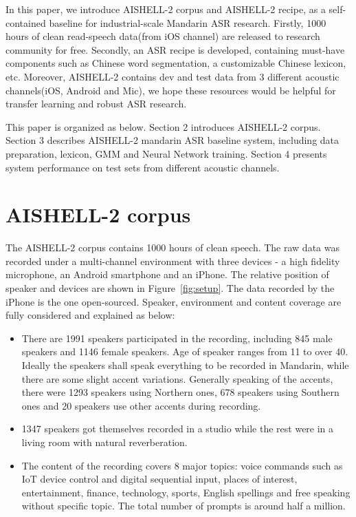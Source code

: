 \documentclass[a4paper]{article}
\begin{document}
In this paper, we introduce AISHELL-2 corpus and AISHELL-2 recipe, as a 
self-contained baseline for industrial-scale Mandarin ASR research. 
Firstly, 1000 hours of clean read-speech data(from iOS channel) are released to research community for free.
Secondly, an ASR recipe is developed, containing must-have components 
such as Chinese word segmentation, a customizable Chinese lexicon, etc. 
Moreover, AISHELL-2 contains dev and test data from 3 different acoustic channels(iOS, Android and Mic),
we hope these resources would be helpful for transfer learning and robust ASR research.

This paper is organized as below. Section 2 introduces AISHELL-2 corpus. 
Section 3 describes AISHELL-2 mandarin ASR baseline system, including data preparation, lexicon, GMM and Neural Network training.
Section 4 presents system performance on test sets from different acoustic channels.

\section{AISHELL-2 corpus}

The AISHELL-2 corpus contains 1000 hours of clean speech. The raw data was recorded under a multi-channel environment with three devices - a high fidelity microphone, an Android smartphone and an iPhone. The relative position of speaker and devices are shown in Figure~\ref{fig:setup}. The data recorded by the iPhone is the one open-sourced. Speaker, environment and content coverage are fully considered and explained as below:
\begin{itemize}
\item There are 1991 speakers participated in the recording, including 845 male speakers and 1146 female speakers. Age of speaker ranges from 11 to over 40. Ideally the speakers shall speak everything to be recorded in Mandarin, while there are some slight accent variations. Generally speaking of the accents, there were 1293 speakers using Northern ones, 678 speakers using Southern ones and 20 speakers use other accents during recording. 
\item 1347 speakers got themselves recorded in a studio while the rest were in a living room with natural reverberation.
\item The content of the recording covers 8 major topics: voice commands such as IoT device control and digital sequential input, places of interest, entertainment, finance, technology, sports, English spellings and free speaking without specific topic. The total number of prompts is around half a million.
\end{itemize}
\end{document}
